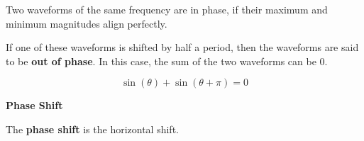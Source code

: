 \documentclass{ximera}
\begin{document}
Two waveforms of the same frequency are in phase, if their maximum and minimum magnitudes align perfectly.

If one of these waveforms is shifted by half a period, then the waveforms are said to be \textbf{out of phase}. In this case, the sum of the two waveforms can be $0$.




\begin{center}
\end{center}






\[
\sin(\theta) + \sin(\theta + \pi) = 0
\]




\begin{definition} \textbf{\textcolor{green!50!black}{Phase Shift}}

The \textbf{phase shift} is the horizontal shift.

\end{definition}
\end{document}
